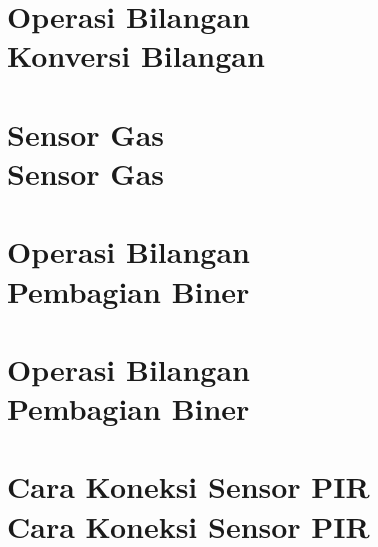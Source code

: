 \documentclass{WileySix}
\begin{document}
\chapter[Konversi Bilangan]
{Operasi Bilangan\\ Konversi Bilangan}


%

%

%

\chapter[Sensor Gas]
{Sensor Gas\\ Sensor Gas}


\chapter[Pembagian Biner]
{Operasi Bilangan\\ Pembagian Biner}


\chapter[Jenis Jenis Arduino]
{Operasi Bilangan\\ Pembagian Biner}


\chapter[Cara Koneksi Sensor PIR]
{Cara Koneksi Sensor PIR\\ Cara Koneksi Sensor PIR}

\end{document}
